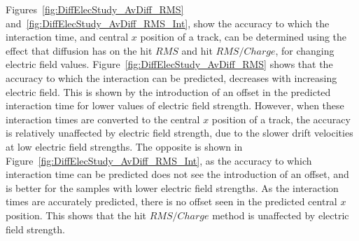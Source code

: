 
Figures~\ref{fig:DiffElecStudy_AvDiff_RMS} and~\ref{fig:DiffElecStudy_AvDiff_RMS_Int}, show the accuracy to which the interaction time, and central $x$ position of a track, can be determined using the effect that diffusion has on the hit $RMS$ and hit $RMS/Charge$, for changing electric field values. Figure~\ref{fig:DiffElecStudy_AvDiff_RMS} shows that the accuracy to which the interaction can be predicted, decreases with increasing electric field. This is shown by the introduction of an offset in the predicted interaction time for lower values of electric field strength. However, when these interaction times are converted to the central $x$ position of a track, the accuracy is relatively unaffected by electric field strength, due to the slower drift velocities at low electric field strengths. The opposite is shown in Figure~\ref{fig:DiffElecStudy_AvDiff_RMS_Int}, as the accuracy to which interaction time can be predicted does not see the introduction of an offset, and is better for the samples with lower electric field strengths. As the interaction times are accurately predicted, there is no offset seen in the predicted central $x$ position. This shows that the hit $RMS/Charge$ method is unaffected by electric field strength. \\

